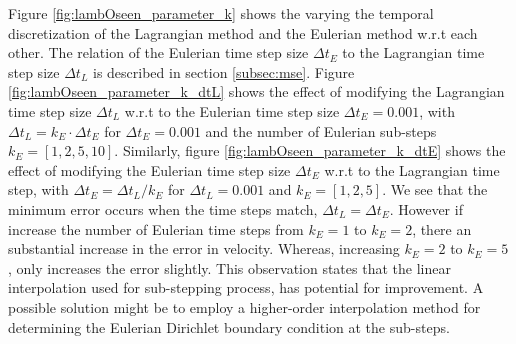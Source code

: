 Figure \ref{fig:lambOseen_parameter_k} shows the varying the temporal discretization of the Lagrangian method and the Eulerian method w.r.t each other. The relation of the Eulerian time step size $\Delta t_E$ to the Lagrangian time step size $\Delta t_L$ is described in section \ref{subsec:mse}. Figure \ref{fig:lambOseen_parameter_k_dtL} shows the effect of modifying the Lagrangian time step size $\Delta t_L$ w.r.t to the Eulerian time step size $\Delta t_E=0.001$, with $\Delta t_L = k_E\cdot\Delta t_E$ for $\Delta t_E = 0.001$ and the number of Eulerian sub-steps $k_E = [1,2,5,10]$. Similarly, figure \ref{fig:lambOseen_parameter_k_dtE} shows the effect of modifying the Eulerian time step size $\Delta t_E$ w.r.t to the Lagrangian time step, with $\Delta t_E = \Delta t_L/k_E$ for $\Delta t_L=0.001$ and $k_E = [1,2,5]$. We see that the minimum error occurs when the time steps match, $\Delta t_L = \Delta t_E$. However if increase the number of Eulerian time steps from $k_E = 1 $ to $k_E=2$, there an substantial increase in the error in velocity. Whereas, increasing $k_E=2$ to $k_E=5$, only increases the error slightly. This observation states that the linear interpolation used for sub-stepping process, has potential for improvement. A possible solution might be to employ a higher-order interpolation method for determining the Eulerian Dirichlet boundary condition at the sub-steps.

